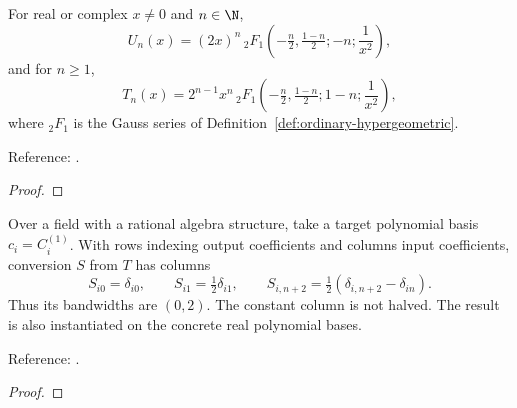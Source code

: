 \begin{supporting}
\begin{theorem}
\label{thm:chebyshev-hypergeometric-inverse-square}
\leanok
For real or complex $x\ne0$ and $n\in\N$,
\[U_n(x)=(2x)^n\,{}_2F_1\!\left(-\tfrac n2,\tfrac{1-n}2;-n;\frac1{x^2}\right),\]
and for $n\ge1$,
\[T_n(x)=2^{n-1}x^n\,{}_2F_1\!\left(-\tfrac n2,\tfrac{1-n}2;1-n;\frac1{x^2}\right),\]
where ${}_2F_1$ is the Gauss series of Definition~\ref{def:ordinary-hypergeometric}.

Reference: \cite[18.5.11\_1 and 18.5.11\_3]{dlmf}.
\end{theorem}
\begin{proof}
\leanok
\end{proof}
\end{supporting}


\begin{theorem}
\label{thm:chebyshev-ultraspherical-conversion-matrix}
\leanok
Over a field with a rational algebra structure, take a target polynomial basis
$c_i=C_i^{(1)}$. With rows indexing output coefficients and columns input
coefficients, conversion $S$ from $T$ has columns
\[
 S_{i0}=\delta_{i0},\qquad S_{i1}=\tfrac12\delta_{i1},\qquad
 S_{i,n+2}=\tfrac12(\delta_{i,n+2}-\delta_{in}).
\]
Thus its bandwidths are $(0,2)$. The constant column is not halved.
The result is also instantiated on the concrete real polynomial bases.

Reference: \cite[equation (2.8)]{olver-townsend}.
\end{theorem}
\begin{proof}
\leanok
\end{proof}

